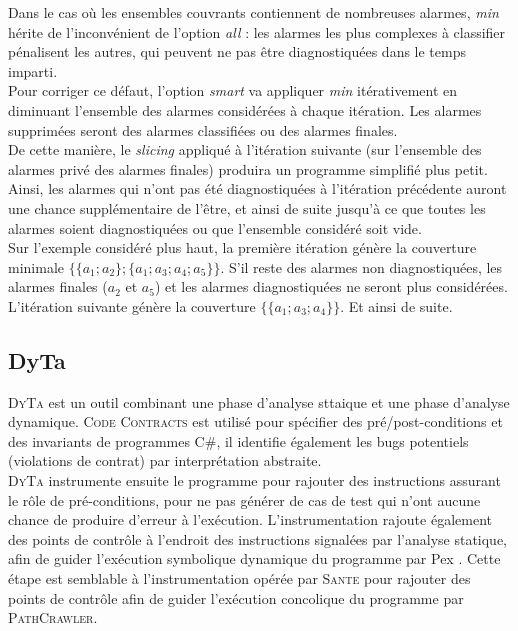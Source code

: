 Dans le cas où les ensembles couvrants contiennent de nombreuses alarmes,
{\em min} hérite de l'inconvénient de l'option {\em all} : les alarmes les plus
complexes à classifier pénalisent les autres, qui peuvent ne pas être
diagnostiquées dans le temps imparti.\\

Pour corriger ce défaut, l'option {\em smart} va appliquer {\em min}
itérativement en diminuant l'ensemble des alarmes considérées à chaque
itération. Les alarmes supprimées seront des alarmes classifiées ou des alarmes
finales.\\

De cette manière, le {\em slicing} appliqué à l'itération suivante (sur
l'ensemble des alarmes privé des alarmes finales) produira un programme
simplifié plus petit. Ainsi, les alarmes qui n'ont pas été diagnostiquées à
l'itération précédente auront une chance supplémentaire de l'être, et ainsi de
suite jusqu'à ce que toutes les alarmes soient diagnostiquées ou que l'ensemble
considéré soit vide.\\

Sur l'exemple considéré plus haut, la première itération génère la
couverture minimale $\{\{a_1; a_2\}; \{a_1; a_3; a_4; a_5\}\}$. S'il reste des
alarmes non diagnostiquées, les alarmes finales ($a_2$ et $a_5$) et les alarmes
diagnostiquées ne seront plus considérées. L'itération suivante génère la
couverture $\{\{a_1; a_3; a_4\}\}$. Et ainsi de suite.


\subsection{DyTa}

\textsc{DyTa} \cite{DyTa} est un outil combinant une phase d'analyse sttaique et
une phase d'analyse dynamique. \textsc{Code Contracts} \cite{CodeContracts} est
utilisé pour spécifier des pré/post-conditions et des invariants de programmes
C\#, il identifie également les bugs potentiels (violations de contrat) par
interprétation abstraite.\\

\textsc{DyTa} instrumente ensuite le programme pour rajouter des instructions
assurant le rôle de pré-conditions, pour ne pas générer de cas de test qui n'ont
aucune chance de produire d'erreur à l'exécution. L'instrumentation rajoute
également des points de contrôle à l'endroit des instructions signalées par
l'analyse statique, afin de guider l'exécution symbolique dynamique du programme
par Pex \cite{Pex}. Cette étape est semblable à l'instrumentation opérée par
\textsc{Sante} pour rajouter des points de contrôle afin de guider l'exécution
concolique du programme par \textsc{PathCrawler}.\\

